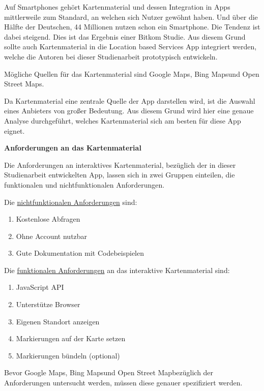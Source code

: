 Auf Smartphones gehört Kartenmaterial und dessen Integration in Apps mittlerweile zum Standard, an welchen sich Nutzer gewöhnt haben. Und über die Hälfte der Deutschen, 44 Millionen nutzen schon ein Smartphone. Die Tendenz ist dabei steigend. Dies ist das Ergebnis einer Bitkom Studie. \cite{bitkom} Aus diesem Grund sollte auch Kartenmaterial in die Location based Services App integriert werden, welche die Autoren bei dieser Studienarbeit prototypisch entwickeln. 

Mögliche Quellen für das Kartenmaterial sind \glqq Google Maps\grqq, \glqq Bing Maps\grqq  und \glqq Open Street Maps\grqq.

Da Kartenmaterial eine zentrale Quelle der App darstellen wird, ist die Auswahl eines Anbieters von großer Bedeutung. Aus diesem Grund wird hier eine genaue Analyse durchgeführt, welches Kartenmaterial sich am besten für diese App eignet.

\textbf{Anforderungen an das Kartenmaterial}


Die Anforderungen an interaktives Kartenmaterial, bezüglich der in dieser Studienarbeit entwickelten App, lassen sich in zwei Gruppen einteilen, die funktionalen und nichtfunktionalen Anforderungen.

Die \underline{nichtfunktionalen Anforderungen} sind:
\begin{enumerate}
\item Kostenlose Abfragen
\item Ohne Account nutzbar
\item Gute Dokumentation mit Codebeispielen
\end{enumerate}

Die \underline{funktionalen Anforderungen} an das interaktive Kartenmaterial sind:
\begin{enumerate}
\item JavaScript API
\item Unterstütze Browser
\item Eigenen Standort anzeigen
\item Markierungen auf der Karte setzen
\item Markierungen bündeln (optional)
\end{enumerate}

Bevor \glqq Google Maps\grqq, \glqq Bing Maps\grqq  und \glqq Open Street Map\grqq  bezüglich der Anforderungen untersucht werden, müssen diese genauer spezifiziert werden.


